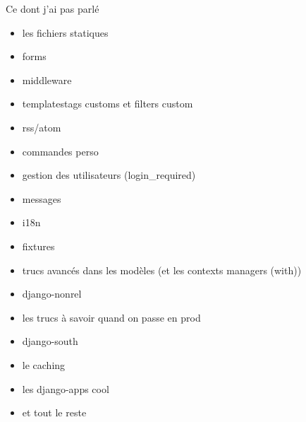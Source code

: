 \documentclass{beamer}
\begin{document}
\begin{frame}[fragile]{Ce dont j'ai pas parlé}
    \begin{itemize}
        \item les fichiers statiques
        \item forms
        \item middleware
        \item templatestags customs et filters custom
        \item rss/atom
        \item commandes perso
        \item gestion des utilisateurs (login\_required)
        \item messages
        \item i18n
        \item fixtures
        \item trucs avancés dans les modèles (et les contexts managers (with))
        \item django-nonrel
        \item les trucs à savoir quand on passe en prod
        \item django-south
        \item le caching
        \item les django-apps cool
        \item et tout le reste
    \end{itemize}
\end{frame}
\end{document}
